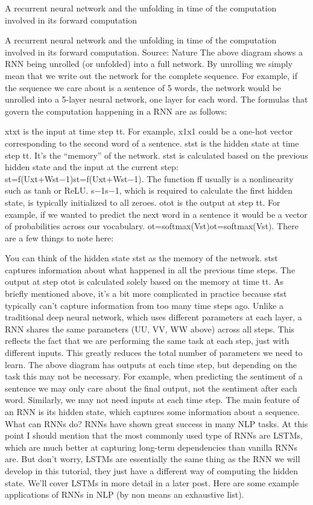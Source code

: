 A recurrent neural network and the unfolding in time of the computation involved in its forward computation

A recurrent neural network and the unfolding in time of the computation involved in its forward computation. Source: Nature The above diagram shows a RNN being unrolled (or unfolded) into a full network. By unrolling we simply mean that we write out the network for the complete sequence. For example, if the sequence we care about is a sentence of 5 words, the network would be unrolled into a 5-layer neural network, one layer for each word. The formulas that govern the computation happening in a RNN are as follows:

xtxt is the input at time step tt. For example, x1x1 could be a one-hot vector corresponding to the second word of a sentence.
stst is the hidden state at time step tt. It’s the “memory” of the network. stst is calculated based on the previous hidden state and the input at the current step: st=f(Uxt+Wst−1)st=f(Uxt+Wst−1). The function ff usually is a nonlinearity such as tanh or ReLU. s−1s−1, which is required to calculate the first hidden state, is typically initialized to all zeroes.
otot is the output at step tt. For example, if we wanted to predict the next word in a sentence it would be a vector of probabilities across our vocabulary. ot=softmax(Vst)ot=softmax(Vst).
There are a few things to note here:

You can think of the hidden state stst as the memory of the network. stst captures information about what happened in all the previous time steps. The output at step otot is calculated solely based on the memory at time tt. As briefly mentioned above, it’s a bit more complicated in practice because stst typically can’t capture information from too many time steps ago.
Unlike a traditional deep neural network, which uses different parameters at each layer, a RNN shares the same parameters (UU, VV, WW above) across all steps. This reflects the fact that we are performing the same task at each step, just with different inputs. This greatly reduces the total number of parameters we need to learn.
The above diagram has outputs at each time step, but depending on the task this may not be necessary. For example, when predicting the sentiment of a sentence we may only care about the final output, not the sentiment after each word. Similarly, we may not need inputs at each time step. The main feature of an RNN is its hidden state, which captures some information about a sequence.
What can RNNs do?
RNNs have shown great success in many NLP tasks. At this point I should mention that the most commonly used type of RNNs are LSTMs, which are much better at capturing long-term dependencies than vanilla RNNs are. But don’t worry, LSTMs are essentially the same thing as the RNN we will develop in this tutorial, they just have a different way of computing the hidden state. We’ll cover LSTMs in more detail in a later post. Here are some example applications of RNNs in NLP (by non means an exhaustive list).

